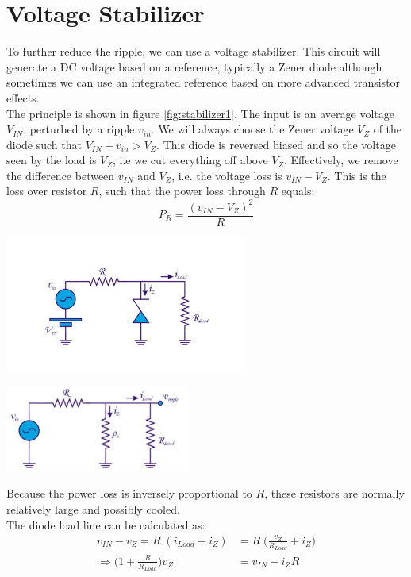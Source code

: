 \section{Voltage Stabilizer}
\label{sec:voltage_stabilizer}
To further reduce the ripple, we can use a voltage stabilizer. This circuit will generate a DC voltage based on a reference, typically a Zener diode although sometimes we can use an integrated reference based on more advanced transistor effects.\\
The principle is shown in figure \ref{fig:stabilizer1}. The input is an average voltage $V_{IN}$, perturbed by a ripple $v_{in}$. We will always choose the Zener voltage $V_Z$ of the diode such that $V_{IN} + v_{in} > V_Z$. This diode is reversed biased and so the voltage seen by the load is $V_Z$, i.e we cut everything off above $V_Z$. Effectively, we remove the difference between $v_{IN}$ and $V_Z$, i.e. the voltage loss is $v_ {IN} - V_Z$. This is the loss over resistor $R$, such that the power loss through $R$ equals:
$$
P_R = \frac{(v_{IN} - V_Z)^2}{R}
$$
\begin{minipage}{.5\textwidth}
	\centering
	\includegraphics[width=8cm]{figures/ch12/stabilizer1.jpg}
	\label{fig:stabilizer1}
\end{minipage}%
\begin{minipage}{.5\textwidth}
	\centering
	\includegraphics[width=6cm]{figures/ch12/stabilizer3.jpg}
	\label{fig:stabilizer3}
\end{minipage}
Because the power loss is inversely proportional to $R$, these resistors are normally relatively large and possibly cooled.\\
The diode load line can be calculated as:
\begin{align*}
	v_{IN} - v_Z = R\; (i_{Load} + i_Z) &= R \; \big( \frac{v_Z}{R_{Load}} + i_Z) \\
	\Rightarrow  \bigg(1 + \frac{R}{R_{Load}} \bigg) v_Z &= v_{IN} - i_Z R
\end{align*}
